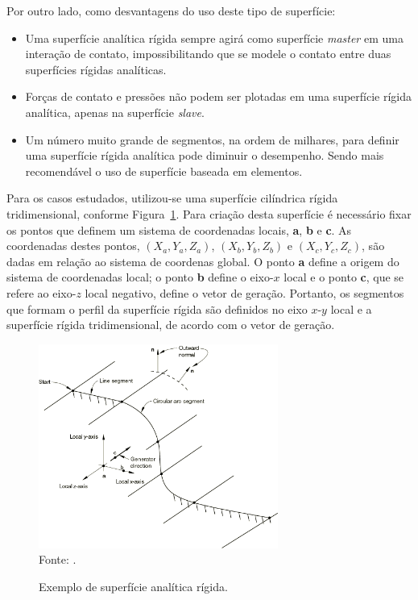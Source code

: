 Por outro lado, como desvantagens do uso deste tipo de superfície:
\begin{itemize}
    \item Uma superfície analítica rígida sempre agirá como superfície \textit{master} em uma interação de contato, impossibilitando que se modele o contato entre duas superfícies rígidas analíticas.
    \item Forças de contato e pressões não podem ser plotadas em uma superfície rígida analítica, apenas na superfície \textit{slave}.
    \item Um número muito grande de segmentos, na ordem de milhares, para definir uma superfície rígida analítica pode diminuir o desempenho. Sendo mais recomendável o uso de superfície baseada em elementos.
\end{itemize}


Para os casos estudados, utilizou-se uma superfície cilíndrica rígida tridimensional, conforme Figura~\ref{fig:superficie_analitica}. Para criação desta superfície é necessário fixar os pontos que definem um sistema de coordenadas locais, \textbf{a}, \textbf{b} e \textbf{c}. As coordenadas destes pontos, $(X_a, Y_a, Z_a)$, $(X_b, Y_b, Z_b)$ e $(X_c, Y_c, Z_c)$, são dadas em relação ao sistema de coordenas global. O ponto \textbf{a} define a origem do sistema de coordenadas local; o ponto \textbf{b} define o eixo-$x$ local e o ponto \textbf{c}, que se refere ao eixo-$z$ local negativo, define o vetor de geração.  Portanto, os segmentos que formam o perfil da superfície rígida são definidos no eixo $x$-$y$ local e a superfície rígida tridimensional, de acordo com o vetor de geração.

\begin{figure}[!ht]
    \centering
    \caption{Exemplo de superfície analítica rígida.}\label{fig:superficie_analitica} 
    \includegraphics[width=0.7\textwidth]{imagens/superficie_analitica}
    \\Fonte: .
\end{figure}
